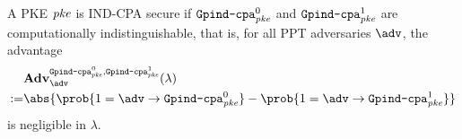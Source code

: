 \begin{security}
\begin{codebox}
\begin{center}
\begin{pchstack}
			\end{pchstack}
		\end{center}
	\end{codebox}
	\vspace{5mm}
	A PKE $\mathit{{pke}}$ is IND-CPA secure if $\text{\texttt{Gpind\text{-}cpa}}^0_{\mathit{{pke}}}$ and $\text{\texttt{Gpind\text{-}cpa}}^1_{\mathit{{pke}}}$ are computationally indistinguishable, that is, for all PPT adversaries $\adv$, the advantage
	\begin{align*}
		   & \mathbf{Adv}_{\adv}^{
		\M{Gpind\text{-}cpa}^0_\pke
		,\M{Gpind\text{-}cpa}^1_\pke}
		(\lambda)                                                                                                \\
		:= & \abs{\prob{1=\adv\circ \M{Gpind\text{-}cpa}^0_\pke}-\prob{1=\adv\circ \M{Gpind\text{-}cpa}^1_\pke}}
	\end{align*}
	is negligible in $\lambda$.
\end{security}



